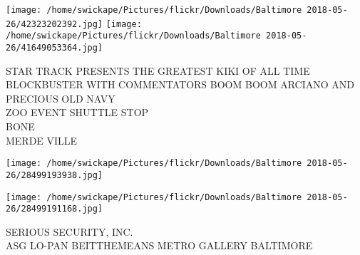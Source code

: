 \documentclass[10pt,letterpaper]{article}
\begin{document}
\texttt{[image: /home/swickape/Pictures/flickr/Downloads/Baltimore 2018-05-26/42323202392.jpg]}
\texttt{[image: /home/swickape/Pictures/flickr/Downloads/Baltimore 2018-05-26/41649053364.jpg]}

STAR TRACK PRESENTS THE GREATEST KIKI OF ALL TIME BLOCKBUSTER WITH COMMENTATORS BOOM BOOM ARCIANO AND PRECIOUS OLD NAVY\\
ZOO EVENT SHUTTLE STOP\\
BONE\\
MERDE VILLE
\pagebreak

\texttt{[image: /home/swickape/Pictures/flickr/Downloads/Baltimore 2018-05-26/28499193938.jpg]}

\vspace{0.25in}
\texttt{[image: /home/swickape/Pictures/flickr/Downloads/Baltimore 2018-05-26/28499191168.jpg]}

SERIOUS SECURITY, INC.\\
ASG LO{-}PAN BEITTHEMEANS METRO GALLERY BALTIMORE
\pagebreak
\end{document}
